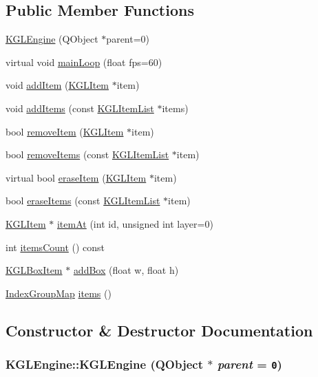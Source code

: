 \subsection*{Public Member Functions}
\begin{CompactItemize}
\item 
\hyperlink{class_k_g_l_engine_6f462f4b94e90736eebe4bc97c9639ea}{KGLEngine} (QObject $\ast$parent=0)
\item 
virtual void \hyperlink{class_k_g_l_engine_787e1d8dfb58a6d6973a1f62c83b3263}{mainLoop} (float fps=60)
\item 
void \hyperlink{class_k_g_l_engine_4aa9d5809d76cc44994a1cdb9df6f3ec}{addItem} (\hyperlink{class_k_g_l_item}{KGLItem} $\ast$item)
\item 
void \hyperlink{class_k_g_l_engine_0b25939d43f254ed6650bf9cded68f60}{addItems} (const \hyperlink{class_k_g_l_item_list}{KGLItemList} $\ast$items)
\item 
bool \hyperlink{class_k_g_l_engine_533f3324f67dcda39192365e2eab40c3}{removeItem} (\hyperlink{class_k_g_l_item}{KGLItem} $\ast$item)
\item 
bool \hyperlink{class_k_g_l_engine_11d424c95a9adf619c36627a6d509072}{removeItems} (const \hyperlink{class_k_g_l_item_list}{KGLItemList} $\ast$item)
\item 
virtual bool \hyperlink{class_k_g_l_engine_66aa5b9783823cf7db5edcc50981999a}{eraseItem} (\hyperlink{class_k_g_l_item}{KGLItem} $\ast$item)
\item 
bool \hyperlink{class_k_g_l_engine_b7f3be194234b978df3f59769f565588}{eraseItems} (const \hyperlink{class_k_g_l_item_list}{KGLItemList} $\ast$item)
\item 
\hyperlink{class_k_g_l_item}{KGLItem} $\ast$ \hyperlink{class_k_g_l_engine_ac35be1039af0dbc2dc208774f085795}{itemAt} (int id, unsigned int layer=0)
\item 
int \hyperlink{class_k_g_l_engine_1cc02d12efbc07e9a40d420f081ba588}{itemsCount} () const 
\item 
\hyperlink{class_k_g_l_box_item}{KGLBoxItem} $\ast$ \hyperlink{class_k_g_l_engine_428426702fca3958cc3ee41149312d68}{addBox} (float w, float h)
\item 
\hyperlink{kglengine_8h_b80cbcec260e71c3207c42d7eba43da1}{IndexGroupMap} \hyperlink{class_k_g_l_engine_4b105206ea488eea87e835339d5473b5}{items} ()
\end{CompactItemize}


\subsection{Constructor \& Destructor Documentation}
\hypertarget{class_k_g_l_engine_6f462f4b94e90736eebe4bc97c9639ea}{
\subsubsection[{KGLEngine}]{\setlength{\rightskip}{0pt plus 5cm}KGLEngine::KGLEngine (QObject $\ast$ {\em parent} = {\tt 0})}}
\label{class_k_g_l_engine_6f462f4b94e90736eebe4bc97c9639ea}




